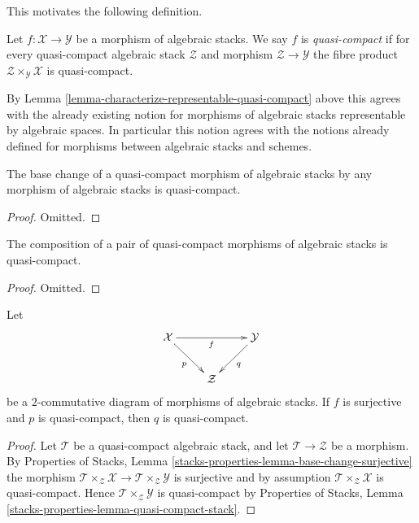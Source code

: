 \noindent
This motivates the following definition.

\begin{definition}
\label{definition-quasi-compact}
Let $f : \mathcal{X} \to \mathcal{Y}$ be a morphism of algebraic stacks.
We say $f$ is {\it quasi-compact} if for every quasi-compact
algebraic stack $\mathcal{Z}$ and morphism $\mathcal{Z} \to \mathcal{Y}$
the fibre product $\mathcal{Z} \times_\mathcal{Y} \mathcal{X}$
is quasi-compact.
\end{definition}

\noindent
By
Lemma \ref{lemma-characterize-representable-quasi-compact}
above this agrees with the already existing notion
for morphisms of algebraic stacks representable by algebraic spaces.
In particular this notion agrees with the notions already defined
for morphisms between algebraic stacks and schemes.

\begin{lemma}
\label{lemma-base-change-quasi-compact}
The base change of a quasi-compact morphism of algebraic stacks
by any morphism of algebraic stacks is quasi-compact.
\end{lemma}

\begin{proof}
Omitted.
\end{proof}

\begin{lemma}
\label{lemma-composition-quasi-compact}
The composition of a pair of quasi-compact morphisms of algebraic stacks
is quasi-compact.
\end{lemma}

\begin{proof}
Omitted.
\end{proof}

\begin{lemma}
\label{lemma-surjection-from-quasi-compact}
Let
$$
\xymatrix{
\mathcal{X} \ar[rr]_f \ar[rd]_p & &
\mathcal{Y} \ar[dl]^q \\
& \mathcal{Z}
}
$$
be a $2$-commutative diagram of morphisms of algebraic stacks.
If $f$ is surjective and $p$ is quasi-compact, then $q$ is quasi-compact.
\end{lemma}

\begin{proof}
Let $\mathcal{T}$ be a quasi-compact algebraic stack, and let
$\mathcal{T} \to \mathcal{Z}$ be a morphism. By
Properties of Stacks,
Lemma \ref{stacks-properties-lemma-base-change-surjective}
the morphism
$\mathcal{T} \times_{\mathcal{Z}} \mathcal{X} \to
\mathcal{T} \times_{\mathcal{Z}} \mathcal{Y}$
is surjective and by assumption
$\mathcal{T} \times_{\mathcal{Z}} \mathcal{X}$
is quasi-compact. Hence 
$\mathcal{T} \times_{\mathcal{Z}} \mathcal{Y}$
is quasi-compact by
Properties of Stacks, Lemma \ref{stacks-properties-lemma-quasi-compact-stack}.
\end{proof}

